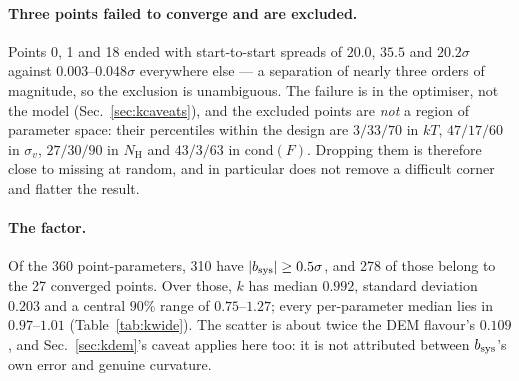 \documentclass[11pt,a4paper]{article}
\newcommand{\nh}{N_{\mathrm{H}}}
\begin{document}
\paragraph{Three points failed to converge and are excluded.} Points 0, 1 and
18 ended with start-to-start spreads of $20.0$, $35.5$ and $20.2\sigma$ against
$0.003$--$0.048\sigma$ everywhere else --- a separation of nearly three orders
of magnitude, so the exclusion is unambiguous. The failure is in the optimiser,
not the model (Sec.~\ref{sec:kcaveats}), and the excluded points are
\emph{not} a region of parameter space: their percentiles within the design are
$3/33/70$ in $kT$, $47/17/60$ in $\sigma_v$, $27/30/90$ in $\nh$ and
$43/3/63$ in $\mathrm{cond}(F)$. Dropping them is therefore close to missing at
random, and in particular does not remove a difficult corner and flatter the
result.

\paragraph{The factor.} Of the 360 point-parameters, 310 have
$|b_{\rm sys}|\ge0.5\sigma$, and 278 of those belong to the 27 converged
points. Over those, $k$ has median $0.992$, standard deviation $0.203$ and a
central $90\%$ range of $0.75$--$1.27$; every per-parameter median lies in
$0.97$--$1.01$ (Table~\ref{tab:kwide}). The scatter is about twice the DEM
flavour's $0.109$, and Sec.~\ref{sec:kdem}'s caveat applies here too: it is not
attributed between $b_{\rm sys}$'s own error and genuine curvature.
\end{document}
